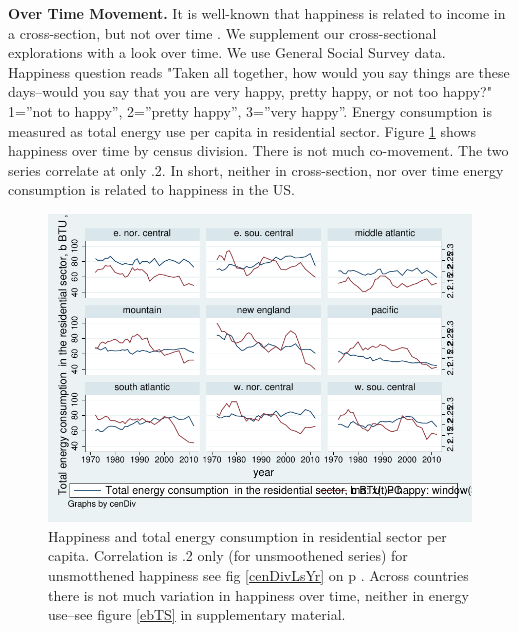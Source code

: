 \documentclass[10pt, letterpaper]{article}
\begin{document}
\begin{spacing}{1.4}
{\bf Over Time Movement.} It is well-known that happiness is related to income
in  a 
cross-section, but not over time \cite{easterlin74,easterlin12}. We
supplement our cross-sectional explorations with a look over time. We use General
Social Survey data.   %
Happiness question reads "Taken all together, how would you say things are
      these days--would you say that you are very happy, pretty happy, or not
      too happy?" 1=''not to happy'', 2=''pretty happy'', 3=''very happy''. 
 Energy consumption is measured as total energy use per capita in
residential sector. %
Figure \ref{cenDivLsYrSm} shows happiness over time by
census division. There is not much co-movement. The two series correlate at only
.2. In short, neither in
cross-section, nor over time energy consumption is related to happiness in
the US. 

\begin{figure}[H]
 \includegraphics[width=5in]{graphsAndTables/cenDivLsYrSm.pdf}\centering
\caption{%
Happiness and total energy consumption
  in residential sector per capita. Correlation is .2 only (for
  unsmoothened series) %
 for unsmotthened happiness see fig \ref{cenDivLsYr} on
  p \pageref{cenDivLsYr}. Across countries there is not much variation in
  happiness over time, neither in energy use--see figure \ref{ebTS} in
  supplementary material. }\label{cenDivLsYrSm}
\end{figure}


\end{spacing}
\end{document}
